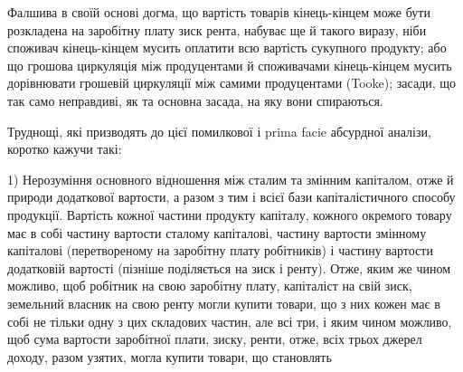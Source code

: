 Фалшива в своїй основі догма, що вартість товарів кінець-кінцем може
бути розкладена на заробітну плату \dplus{} зиск \dplus{} рента, набуває ще й такого виразу,
ніби споживач кінець-кінцем мусить оплатити всю вартість сукупного
продукту; або що грошова циркуляція між продуцентами й споживачами кінець-кінцем
мусить дорівнювати грошевій циркуляції між самими продуцентами
(Tooke); засади, що так само неправдиві, як та основна засада, на яку вони
спираються.

Труднощі, які призводять до цієї помилкової і prima facie абсурдної аналізи,
коротко кажучи такі:

1) Нерозуміння основного відношення між сталим та змінним капіталом,
отже й природи додаткової вартости, а разом з тим і всієї бази капіталістичного
способу продукції. Вартість кожної частини продукту капіталу, кожного
окремого товару має в собі частину вартости \deq{} сталому капіталові, частину
вартости \deq{} змінному капіталові (перетвореному на заробітну плату робітників)
і частину вартости \deq{} додатковій вартості (пізніше поділяється на зиск і ренту).
Отже, яким же чином можливо, щоб робітник на свою заробітну плату, капіталіст
на свій зиск, земельний власник на свою ренту могли купити товари, що
з них кожен має в собі не тільки одну з цих складових частин, але всі три, і
яким чином можливо, щоб сума вартости заробітної плати, зиску, ренти, отже,
всіх трьох джерел доходу, разом узятих, могла купити товари, що становлять
\parbreak{}  %

